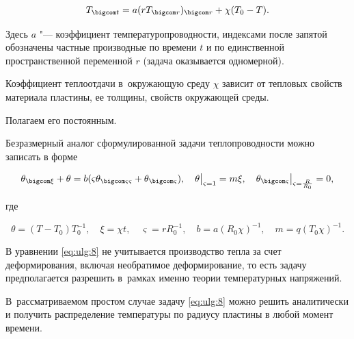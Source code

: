\begin{equation} 

\label{eq:ulg:7}

T_{\bigcom t} =a(rT_{ \bigcom r} )_{\bigcom r} +\chi (T_{0} -T) .

\end{equation}

Здесь $a$ "--- коэффициент температуропроводности, индексами после запятой обозначены частные производные по времени $t$ и по единственной пространственной переменной $r$ (задача оказывается одномерной).  

Коэффициент теплоотдачи в~окружающую среду $\chi $ зависит от тепловых свойств материала пластины, ее толщины, свойств окружающей среды. 

Полагаем его постоянным. 

Безразмерный аналог сформулированной задачи теплопроводности можно записать в форме

\begin{equation} 

\label{eq:ulg:8} 

\theta _{\bigcom \xi } +\theta =b(\varsigma \theta _{ \bigcom \varsigma \varsigma } + \theta _{\bigcom \varsigma}), 

\quad 

\theta \bigr|_{\varsigma =1} =m\xi, 

\quad 

\theta _{\bigcom \varsigma } \bigr|_{\varsigma =\frac{R}{R_{0} } } =0 ,

\end{equation} 

где 

\[

\theta =(T-T_{0} )T_{0} ^{-1}, \quad   

\xi =\chi t, \quad  

\varsigma =rR_{0} ^{-1}, \quad  

b=a(R_{0} \chi )^{-1}, \quad  m=q(T_{0} \chi )^{-1}. 

\]  



В уравнении \eqref{eq:ulg:8} не учитывается производство тепла за счет деформирования, включая необратимое деформирование, то есть задачу предполагается разрешить в~рамках именно теории температурных напряжений. 

В~рассматриваемом простом случае задачу \eqref{eq:ulg:8} можно решить аналитически и получить распределение температуры по радиусу пластины  в любой момент времени. 

